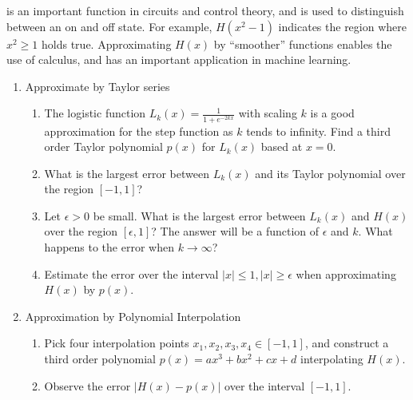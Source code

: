 \begin{enumerate}
                is an important function in circuits and control theory, and is used to distinguish between an on and off state. For example, $H(x^2-1)$ indicates the region where $x^2 \geq 1$ holds true. Approximating $H(x)$ by ``smoother'' functions enables the use of calculus, and has an important application in machine learning. 
                \begin{enumerate}
                    \item Approximate by Taylor series
                    \begin{enumerate}
                        \item The logistic function $L_k(x) = \frac{1}{1+e^{-2kx}}$ with scaling $k$ is a good approximation for the step function as $k$ tends to infinity. Find a third order Taylor polynomial $p(x)$ for $L_k(x)$ based at $x=0$.
                        \item What is the largest error between $L_k(x)$ and its Taylor polynomial over the region $[-1,1]$?  
                        \item Let $\epsilon >0$ be small. What is the largest error between $L_k(x)$ and $H(x)$ over the region $[\epsilon,1]$? The answer will be a function of $\epsilon$ and $k$. What happens to the error when $k\to \infty$?
                        
                        \item Estimate the error over the interval $|x|\leq 1, |x| \geq \epsilon$ when approximating $H(x)$ by $p(x)$. 

                    \end{enumerate}
                
                
                \item Approximation by Polynomial Interpolation

                \begin{enumerate}
                    \item Pick four interpolation points $x_1,x_2,x_3,x_4 \in [-1,1]$, and construct a third order polynomial $p(x) = ax^3 + bx^2 +cx + d$ interpolating $H(x)$.   
                    \item Observe the error $|H(x) - p(x)|$ over the interval $[-1,1]$.  
                \end{enumerate}
                
                \end{enumerate} 


\end{enumerate}
